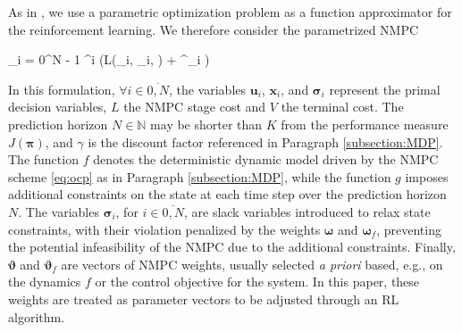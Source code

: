 \documentclass[letterpaper, 10pt, conference]{ieeeconf}
\begin{document}
As in \cite{gros2019data}, we use a parametric optimization problem as a function approximator for the reinforcement learning.
We therefore consider the parametrized NMPC 
\begin{mini!}
	{%
	}{%
		\sum_{i = 0}^{N - 1} \gamma^i \left(L\left(_i, _i, \boldsymbol{\vartheta}\right) + \boldsymbol{\omega}^{\top}\boldsymbol{\sigma}_i \right)
			\nonumber
	}{\label{eq:ocp}}{}
\end{mini!}

In this formulation, $\forall i\in\overline{0,N}$, the variables $\mathbf{u}_i$, $\mathbf{x}_i$, and $\boldsymbol{\sigma}_i$ represent the primal decision variables, $L$ the NMPC stage cost and $V$ the terminal cost. 
The prediction horizon $N\in\mathbb{N}$ may be shorter than $K$ from the performance measure $J(\boldsymbol{\pi})$, and $\gamma$ is the discount factor referenced in Paragraph \ref{subsection:MDP}.
The function $f$ denotes the deterministic dynamic model driven by the NMPC scheme \eqref{eq:ocp} as in Paragraph \ref{subsection:MDP}, while the function $g$ imposes additional constraints on the state at each time step over the prediction horizon $N$.
The variables $\boldsymbol{\sigma}_i$, for $i\in\overline{0,N}$, are slack variables introduced to relax state constraints, with their violation penalized by the weights $\boldsymbol{\omega}$ and $\boldsymbol{\omega}_f$, preventing the potential infeasibility of the NMPC due to the additional constraints.
Finally, $\boldsymbol{\vartheta}$ and $\boldsymbol{\vartheta}_f$ are vectors of NMPC weights, usually selected \textit{a priori} based, e.g., on the dynamics $f$ or the control objective for the system.
In this paper, these weights are treated as parameter vectors to be adjusted through an RL algorithm.
\end{document}
